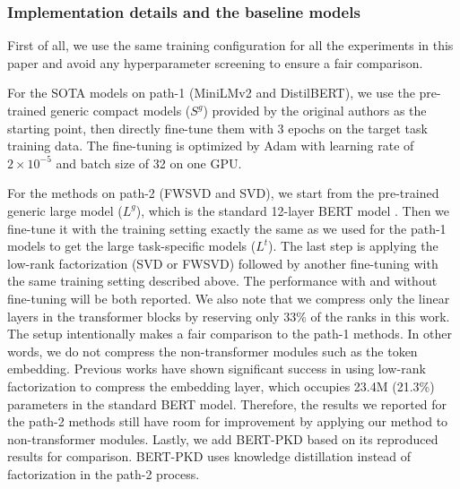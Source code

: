 
\subsubsection{Implementation details and the baseline models}\label{sec:3path_implement}

First of all, we use the same training configuration for all the experiments in this paper and avoid any hyperparameter screening to ensure a fair comparison. 

For the SOTA models on path-1 (MiniLMv2 and DistilBERT), we use the pre-trained generic compact models ($S^g$) provided by the original authors as the starting point, then directly fine-tune them with 3 epochs on the target task training data. The fine-tuning is optimized by Adam with learning rate of $2 \times 10^{-5}$ and batch size of 32 on one GPU.

For the methods on path-2 (FWSVD and SVD), we start from the pre-trained generic large model ($L^g$), which is the standard 12-layer BERT model \citep{devlin2018bert}. Then we fine-tune it with the training setting exactly the same as we used for the path-1 models to get the large task-specific models ($L^t$). The last step is applying the low-rank factorization (SVD or FWSVD) followed by another fine-tuning with the same training setting described above. The performance with and without fine-tuning will be both reported.
We also note that we compress only the linear layers in the transformer blocks by reserving only 33\% of the ranks in this work. The setup intentionally makes a fair comparison to the path-1 methods. In other words, we do not compress the non-transformer modules such as the token embedding. Previous works \citep{chen2018groupreduce} have shown significant success in using low-rank factorization to compress the embedding layer, which occupies 23.4M (21.3\%) parameters in the standard BERT model. Therefore, the results we reported for the path-2 methods still have room for improvement by applying our method to non-transformer modules. Lastly, we add BERT-PKD \citep{sun2019patient} based on its reproduced results \citep{chen2018groupreduce} for comparison. BERT-PKD uses knowledge distillation instead of factorization in the path-2 process.



